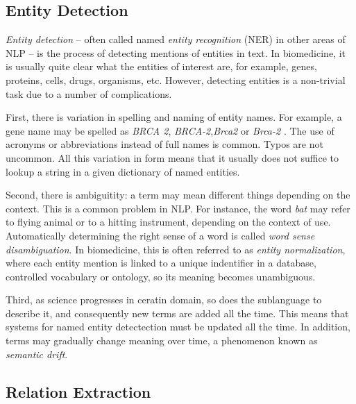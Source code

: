 \subsection{Entity Detection}

\emph{Entity detection} -- often called named \emph{entity recognition} (NER) in other areas of NLP -- is the process of detecting mentions of entities in text.
In biomedicine, it is usually quite clear what the entities of interest are, for example, genes, proteins, cells, drugs, organisms, etc.
However, detecting entities is a non-trivial task due to a number of complications.

First, there is variation in spelling and naming of entity names.
For example, a gene name may be spelled as \emph{BRCA 2},\emph{ BRCA-2},\emph{Brca2} or \emph{Brca-2} \citep{Krallinger2010Analysis}.
The use of acronyms or abbreviations instead of full names is common. 
Typos are not uncommon.
All this variation in form means that it usually does not suffice to lookup a string in a given dictionary of named entities.

Second, there is ambiguitity: a term may mean different things depending on the context.
This is a common problem in NLP.
For instance, the word \emph{bat} may refer to flying animal or to a hitting instrument, depending on the context of use.
Automatically determining the right sense of a word is called \emph{word sense disambiguation}.
In biomedicine, this is often referred to as \emph{entity normalization}, where each entity mention is linked to a unique indentifier in a database, controlled vocabulary or ontology, so its meaning becomes unambiguous. 
 
Third, as science progresses in ceratin domain, so does the sublanguage to describe it, and consequently new terms are added all the time.
This means that systems for named entity detectection must be updated all the time. 
In addition, terms may gradually change meaning over time, a phenomenon known as \emph{semantic drift}.


\subsection{Relation Extraction}   

